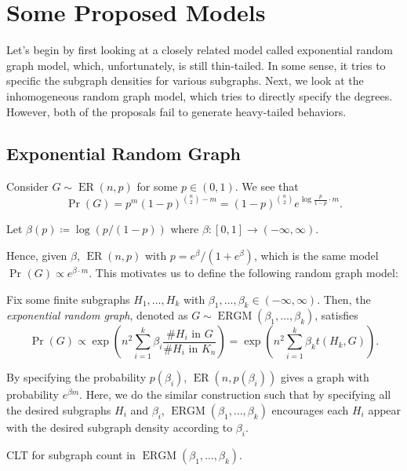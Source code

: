\section{Some Proposed Models}
Let's begin by first looking at a closely related model called exponential random graph model, which, unfortunately, is still thin-tailed. In some sense, it tries to specific the subgraph densities for various subgraphs. Next, we look at the inhomogeneous random graph model, which tries to directly specify the degrees. However, both of the proposals fail to generate heavy-tailed behaviors.

\subsection{Exponential Random Graph}
Consider \(G \sim \operatorname{ER}(n, p) \) for some \(p \in (0, 1)\). We see that
\[
	\Pr_{}\left(G\right)
	= p^{m} (1 - p)^{\binom{n}{2} - m}
	= (1 - p)^{\binom{n}{2}} e^{\log \frac{p}{1-p} \cdot m}.
\]

\begin{notation}
	Let \(\beta (p) \coloneqq \log (p / (1 - p))\) where \(\beta \colon [0, 1] \to (-\infty , \infty )\).
\end{notation}

Hence, given \(\beta \), \(\operatorname{ER}(n, p) \) with \(p = e^\beta / (1 + e^{\beta })\), which is the same model \(\Pr_{}\left(G\right) \propto e^{\beta \cdot m}\). This motivates us to define the following random graph model:

\begin{definition}\label{def:exponential-ranom-graph}
	Fix some finite subgraphs \(H_1, \dots , H_k\) with \(\beta _1, \dots , \beta _k \in (-\infty , \infty )\). Then, the \emph{exponential random graph}, denoted as \(G \sim \operatorname{ERGM}(\beta _1, \dots , \beta _k) \), satisfies
	\[
		\Pr_{}\left(G\right)
		\propto \exp (n^2 \sum_{i=1}^{k} \beta _i \frac{\text{\#\(H_i\) in \(G\)}}{\text{\#\(H_i\) in \(K_n\)}} )
		= \exp (n^2 \sum_{i=1}^{k} \beta _k t(H_k, G) ).
	\]
\end{definition}

\begin{intuition}
	By specifying the probability \(p(\beta _i)\), \(\operatorname{ER}(n, p(\beta _i)) \) gives a graph with probability \(e^{\beta m}\). Here, we do the similar construction such that by specifying all the desired subgraphs \(H_i\) and \(\beta _i\), \(\operatorname{ERGM}(\beta _1, \dots , \beta _k) \) encourages each \(H_i\) appear with the desired subgraph density according to \(\beta _i\).
\end{intuition}

\begin{problem*}
	CLT for subgraph count in \(\operatorname{ERGM}(\beta _1, \dots , \beta _k) \).
\end{problem*}